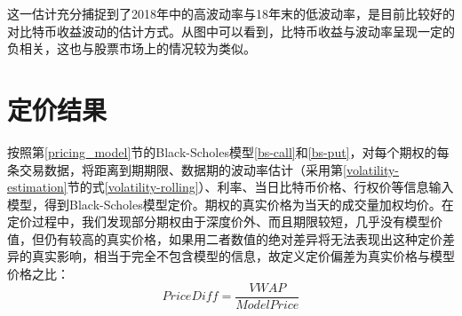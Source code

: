     这一估计充分捕捉到了2018年中的高波动率与18年末的低波动率，是目前比较好的对比特币收益波动的估计方式。从图中可以看到，比特币收益与波动率呈现一定的负相关，这也与股票市场上的情况较为类似。
    \section{定价结果}
按照第\ref{pricing_model}节的Black-Scholes模型\ref{bs-call}和\ref{bs-put}，对每个期权的每条交易数据，将距离到期期限、数据期的波动率估计（采用第\ref{volatility-estimation}节的式\ref{volatility-rolling}）、利率、当日比特币价格、行权价等信息输入模型，得到Black-Scholes模型定价。期权的真实价格为当天的成交量加权均价。在定价过程中，我们发现部分期权由于深度价外、而且期限较短，几乎没有模型价值，但仍有较高的真实价格，如果用二者数值的绝对差异将无法表现出这种定价差异的真实影响，相当于完全不包含模型的信息，故定义定价偏差为真实价格与模型价格之比：
\begin{equation}
    Price Diff=\frac{VWAP}{Model Price}
    \label{eq:diff}
\end{equation}


